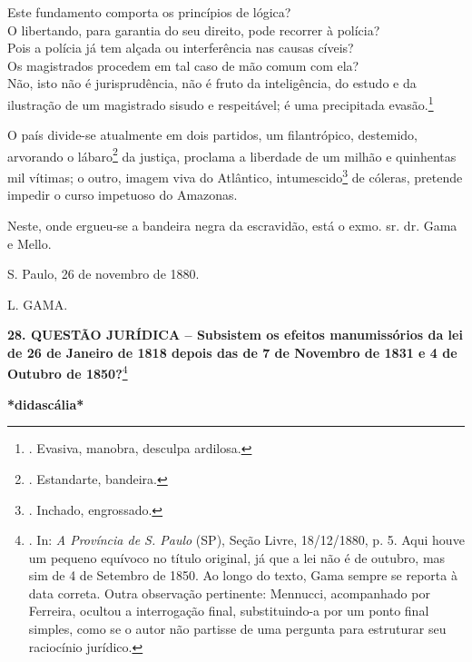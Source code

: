 Este fundamento comporta os princípios de lógica?\\
O libertando, para garantia do seu direito, pode recorrer à polícia?\\
Pois a polícia já tem alçada ou interferência nas causas cíveis?\\
Os magistrados procedem em tal caso de mão comum com ela?\\
Não, isto não é jurisprudência, não é fruto da inteligência, do estudo e
da ilustração de um magistrado sisudo e respeitável; é uma precipitada
evasão.\footnote{. Evasiva, manobra, desculpa ardilosa.}

O país divide-se atualmente em dois partidos, um filantrópico,
destemido, arvorando o lábaro\footnote{. Estandarte, bandeira.} da
justiça, proclama a liberdade de um milhão e quinhentas mil vítimas; o
outro, imagem viva do Atlântico, intumescido\footnote{. Inchado,
  engrossado.} de cóleras, pretende impedir o curso impetuoso do
Amazonas.

Neste, onde ergueu-se a bandeira negra da escravidão, está o exmo. sr.
dr. Gama e Mello.

S. Paulo, 26 de novembro de 1880.

L. GAMA.

\textbf{28. QUESTÃO JURÍDICA -- Subsistem os efeitos manumissórios da
lei de 26 de Janeiro de 1818 depois das de 7 de Novembro de 1831 e 4 de
Outubro de 1850?}\footnote{. In: \emph{A Província de S. Paulo} (SP),
  Seção Livre, 18/12/1880, p. 5. Aqui houve um pequeno equívoco no
  título original, já que a lei não é de outubro, mas sim de 4 de
  Setembro de 1850. Ao longo do texto, Gama sempre se reporta à data
  correta. Outra observação pertinente: Mennucci, acompanhado por
  Ferreira, ocultou a interrogação final, substituindo-a por um ponto
  final simples, como se o autor não partisse de uma pergunta para
  estruturar seu raciocínio jurídico.}

\textbf{*didascália*}

